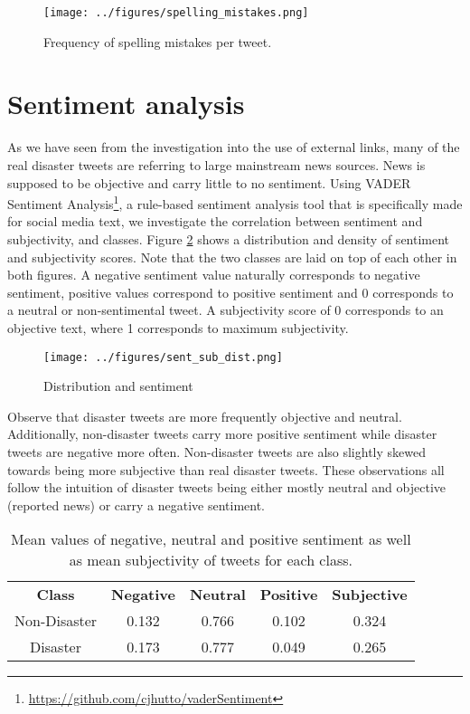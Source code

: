 \documentclass[journal, ]{IEEEtran}
\let\MYoriglatexcaption\caption
\renewcommand{\caption}[2][\relax]{\MYoriglatexcaption[#2]{#2}}
\begin{document}
\begin{figure}[hbt!]
  \centering
  \texttt{[image: ../figures/spelling\_mistakes.png]}
  \caption{Frequency of spelling mistakes per tweet.}
  \label{fig:spelling_mistakes}
\end{figure}

\section{Sentiment analysis}
As we have seen from the investigation into the use of external links, many of
the real disaster tweets are referring to large mainstream news sources. News
is supposed to be objective and carry little to no sentiment. Using VADER
Sentiment Analysis\footnote{\url{https://github.com/cjhutto/vaderSentiment}}, a
rule-based sentiment analysis tool that is specifically made for social media
text, we investigate the correlation between sentiment and subjectivity, and
classes. Figure \ref{fig:sent_sub_dist} shows a distribution and density of
sentiment and subjectivity scores. Note that the two classes are laid on top of
each other in both figures. A negative sentiment value naturally corresponds to
negative sentiment, positive values correspond to positive sentiment and 0
corresponds to a neutral or non-sentimental tweet. A subjectivity score of 0
corresponds to an objective text, where 1 corresponds to maximum subjectivity.

\begin{figure}[hbt!]
  \centering
  \texttt{[image: ../figures/sent\_sub\_dist.png]}
  \caption{Distribution and sentiment }
  \label{fig:sent_sub_dist}
\end{figure}

Observe that disaster tweets are more frequently objective and neutral.
Additionally, non-disaster tweets carry more positive sentiment while disaster
tweets are negative more often. Non-disaster tweets are also slightly skewed
towards being more subjective than real disaster tweets. These observations all
follow the intuition of disaster tweets being either mostly neutral and
objective (reported news) or carry a negative sentiment. 

\begin{table}[hbt!]
  \begin{center}
   \begin{tabular}{c|c|c|c|c} 
   \hline
    \textbf{Class} & \textbf{Negative} & 
      \textbf{Neutral} & \textbf{Positive} & \textbf{Subjective}\\
    Non-Disaster & 0.132 & 0.766 & 0.102 & 0.324\\
    Disaster & 0.173 & 0.777 & 0.049 & 0.265\\
   \hline
  \end{tabular}
  \end{center}
  \caption{Mean values of negative, neutral and positive sentiment as well as
  mean subjectivity of tweets for each class.}
  \label{tab:sentiment}
\end{table}
\end{document}
